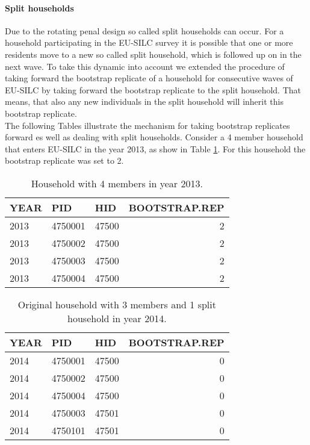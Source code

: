 \documentclass{scrartcl}\usepackage[]{graphicx}\usepackage[]{color}
\begin{document}
\paragraph{Split households}
Due to the rotating penal design so called split households can occur. For a household participating in the EU-SILC survey it is possible that one or more residents move to a new so called split household, which is followed up on in the next wave. To take this dynamic into account we extended the procedure of taking forward the bootstrap replicate of a household for consecutive waves of EU-SILC by taking forward the bootstrap replicate to the split household. That means, that also any new individuals in the split household will inherit this bootstrap replicate.\\
\newline
The following Tables illustrate the mechanism for taking bootstrap replicates forward es well as dealing with split households.
Consider a 4 member household that enters EU-SILC in the year 2013, as show in Table \ref{tab:hh1}. For this household the bootstrap replicate was set to 2.



\begin{table}

\caption{\label{tab:hh1}Household with 4 members in year 2013.}
\centering
\begin{tabular}[t]{lllr}
\toprule
YEAR & PID & HID & BOOTSTRAP.REP\\
\midrule
2013 & 4750001 & 47500 & 2\\
2013 & 4750002 & 47500 & 2\\
2013 & 4750003 & 47500 & 2\\
2013 & 4750004 & 47500 & 2\\
\bottomrule
\end{tabular}
\end{table}



\begin{table}

\caption{\label{tab:hh2}Original household with 3 members and 1 split household in year 2014.}
\centering
\begin{tabular}[t]{lllr}
\toprule
YEAR & PID & HID & BOOTSTRAP.REP\\
\midrule
2014 & 4750001 & 47500 & 0\\
2014 & 4750002 & 47500 & 0\\
2014 & 4750004 & 47500 & 0\\
2014 & 4750003 & 47501 & 0\\
2014 & 4750101 & 47501 & 0\\
\bottomrule
\end{tabular}
\end{table}
\end{document}
